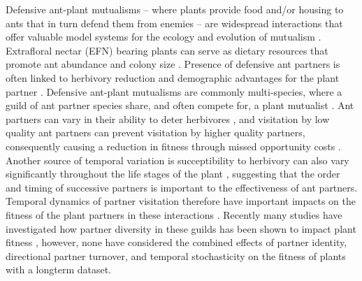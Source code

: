 \documentclass[11pt]{article}
\begin{document}
Defensive ant-plant mutualisms -- where plants provide food and/or housing to ants that in turn defend them from enemies -- are widespread interactions that offer valuable model systems for the ecology and evolution of mutualism \citep{Bronstein1998, Bronstein2006}. 
Extrafloral nectar (EFN) bearing plants can serve as dietary resources that promote ant abundance and colony size \citep{Byk2011, Ness2009, Ness2006}.
Presence of defensive ant partners is often linked to herbivory reduction \citep{Trager2010, Rudgers2004} and demographic advantages for the plant partner \citep{Baez2016}.
Defensive ant-plant mutualisms are commonly multi-species, where a guild of ant partner species share, and often compete for, a plant mutualist \citep{Bronstein1998, Beattie1985, Trager2010, Agrawal1998}.
Ant partners can vary in their ability to deter herbivores \citep{bruna2004}, and visitation by low quality ant partners can prevent visitation by higher quality partners, consequently causing a reduction in fitness through missed opportunity costs \citep{Fraser2001, Frederickson2005}.
Another source of temporal variation is succeptibility to herbivory can also vary significantly throughout the life stages of the plant \citep{Boege2005}, suggesting that the order and timing of successive partners is important to the effectiveness of ant partners.
Temporal dynamics of partner visitation therefore have important impacts on the fitness of the plant partners in these interactions \citep{Barton2010, Boege2005, Fonseca2003}.
Recently many studies have investigated how partner diversity in these guilds has been shown to impact plant fitness \citep{Palmer2010, Afkhami2014,Barrett2015, Ushio2020}, however, none have considered the combined effects of partner identity, directional partner turnover, and temporal stochasticity on the fitness of plants with a longterm dataset. 
	
\end{document}
